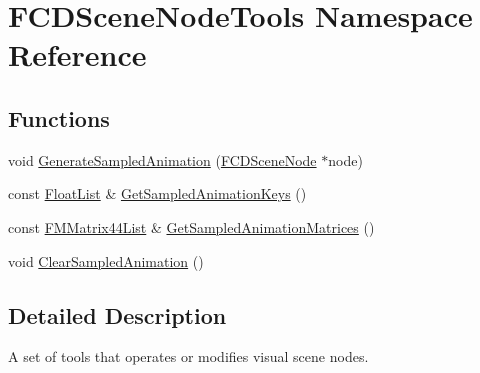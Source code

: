 \hypertarget{namespaceFCDSceneNodeTools}{
\section{FCDSceneNodeTools Namespace Reference}
\label{namespaceFCDSceneNodeTools}
}
\subsection*{Functions}
\begin{DoxyCompactItemize}
\item 
void \hyperlink{namespaceFCDSceneNodeTools_aafd7cc2fc87eedc9a9d9dfe0bc4d5cc4}{GenerateSampledAnimation} (\hyperlink{classFCDSceneNode}{FCDSceneNode} $\ast$node)
\item 
const \hyperlink{classfm_1_1vector}{FloatList} \& \hyperlink{namespaceFCDSceneNodeTools_a4647f5d3d0de085c6ce0876337c20f37}{GetSampledAnimationKeys} ()
\item 
const \hyperlink{classfm_1_1vector}{FMMatrix44List} \& \hyperlink{namespaceFCDSceneNodeTools_a335172c626e7560fee3f5bb52576ce96}{GetSampledAnimationMatrices} ()
\item 
void \hyperlink{namespaceFCDSceneNodeTools_a3de8a2a518c8950dfdf31158f63387b7}{ClearSampledAnimation} ()
\end{DoxyCompactItemize}


\subsection{Detailed Description}
A set of tools that operates or modifies visual scene nodes. 

